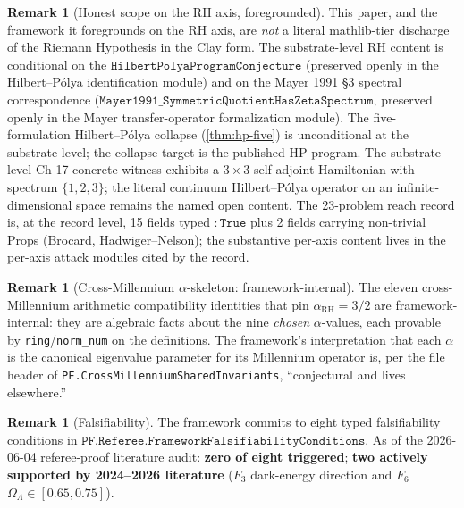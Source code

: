 \documentclass[11pt,a4paper]{article}
\theoremstyle{plain}
\theoremstyle{definition}
\newtheorem{remark}[theorem]{Remark}
\begin{document}
\begin{remark}[Honest scope on the RH axis, foregrounded]
\label{rem:honest-scope-rh}
This paper, and the framework it foregrounds on the RH axis, are
\emph{not} a literal mathlib-tier discharge of the Riemann Hypothesis
in the Clay form. The substrate-level RH content is conditional on
the $\mathtt{HilbertPolyaProgramConjecture}$ (preserved openly in
the Hilbert--P\'olya identification module) and on the Mayer 1991 \S3
spectral correspondence
($\mathtt{Mayer1991\_SymmetricQuotientHasZetaSpectrum}$, preserved
openly in the Mayer transfer-operator formalization module). The
five-formulation Hilbert--P\'olya collapse
(\cref{thm:hp-five}) is unconditional at the substrate level; the
collapse target is the published HP program. The substrate-level Ch
17 concrete witness exhibits a $3\times 3$ self-adjoint Hamiltonian
with spectrum $\{1,2,3\}$; the literal continuum Hilbert--P\'olya
operator on an infinite-dimensional space remains the named open
content. The 23-problem reach record is, at the record level, 15
fields typed $\mathtt{: True}$ plus 2 fields carrying non-trivial
Props (Brocard, Hadwiger--Nelson); the substantive per-axis content
lives in the per-axis attack modules cited by the record.
\end{remark}

\begin{remark}[Cross-Millennium $\alpha$-skeleton: framework-internal]
\label{rem:alpha-internal}
The eleven cross-Millennium arithmetic compatibility identities that
pin $\alpha_{\mathrm{RH}} = 3/2$ are framework-internal: they are
algebraic facts about the nine \emph{chosen} $\alpha$-values, each
provable by \texttt{ring}/\texttt{norm\_num} on the definitions. The
framework's interpretation that each $\alpha$ is the canonical
eigenvalue parameter for its Millennium operator is, per the file
header of \texttt{PF.CrossMillenniumSharedInvariants}, ``conjectural
and lives elsewhere.''
\end{remark}

\begin{remark}[Falsifiability]
\label{rem:falsifiability}
The framework commits to eight typed falsifiability conditions in
$\mathtt{PF.Referee.FrameworkFalsifiabilityConditions}$. As of the
2026-06-04 referee-proof literature audit: \textbf{zero of eight
triggered}; \textbf{two actively supported by 2024--2026 literature}
($F_3$ dark-energy direction and $F_6$
$\Omega_{\Lambda} \in [0.65, 0.75]$).
\end{remark}
\end{document}
